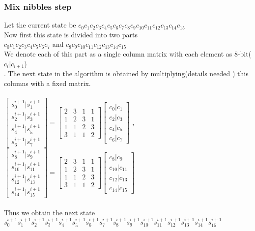 \documentclass[preprint]{transcrypto}
\begin{document}
\subsubsection{Mix nibbles step}
Let the current state be $c_{0} c_{1} c_{2} c_{3} c_{4} c_{5} c_{6} c_{7} c_{8} c_{9} c_{10} c_{11} c_{12} c_{13} c_{14} c_{15}$\\
Now first this state is divided into two parts \\
$ c_{0} c_{1} c_{2} c_{3} c_{4} c_{5} c_{6} c_{7} $ and $c_{8} c_{9} c_{10} c_{11} c_{12} c_{13} c_{14} c_{15}$ \\
We denote each of this part as a single column matrix with each element as 8-bit($c_{i}|c_{i+1}$) \\. The next state in the algorithm is obtained by multiplying(details needed ) this columns with a fixed matrix.
\\ \\
$\begin{bmatrix}
s^{i+1}_{0} | s^{i+1}_{1}\\
s^{i+1}_{2} | s^{i+1}_{3}\\
s^{i+1}_{4} | s^{i+1}_{5}\\
s^{i+1}_{6} | s^{i+1}_{7}
\end{bmatrix}=
\begin{bmatrix}
2&3&1&1\\
1&2&3&1\\
1&1&2&3\\
3&1&1&2
\end{bmatrix}
\begin{bmatrix}
c_{0}|c_{1}\\
c_{2}|c_{3}\\
c_{4}|c_{5}\\
c_{6}|c_{7}
\end{bmatrix}  $ ,
$\begin{bmatrix}
s^{i+1}_{8} | s^{i+1}_{9}\\
s^{i+1}_{10} | s^{i+1}_{11}\\
s^{i+1}_{12} | s^{i+1}_{13}\\
s^{i+1}_{14} | s^{i+1}_{15}
\end{bmatrix}=
\begin{bmatrix}
2&3&1&1\\
1&2&3&1\\
1&1&2&3\\
3&1&1&2
\end{bmatrix}
\begin{bmatrix}
c_{8}|c_{9}\\
c_{10}|c_{11}\\
c_{12}|c_{13}\\
c_{14}|c_{15}
\end{bmatrix}  $\\ \\
Thus we obtain the next state 
$ s^{i+1}_{0}  s^{i+1}_{1}
s^{i+1}_{2}  s^{i+1}_{3}
s^{i+1}_{4}  s^{i+1}_{5}
s^{i+1}_{6}  s^{i+1}_{7}
s^{i+1}_{8}  s^{i+1}_{9}
s^{i+1}_{10}  s^{i+1}_{11}
s^{i+1}_{12}  s^{i+1}_{13}
s^{i+1}_{14}  s^{i+1}_{15} $
\end{document}
